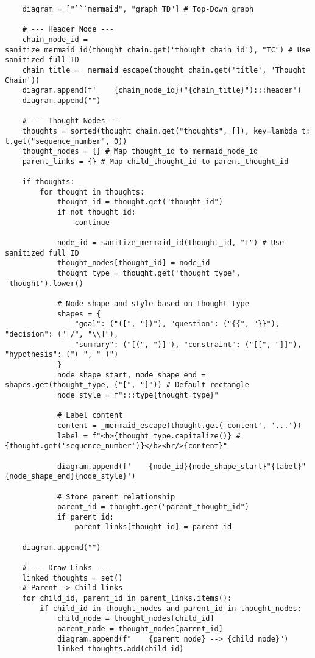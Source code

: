 \documentclass[12pt,a4paper]{article}
\begin{document}
\begin{pageablecode}
\begin{verbatim}
    diagram = ["```mermaid", "graph TD"] # Top-Down graph

    # --- Header Node ---
    chain_node_id = sanitize_mermaid_id(thought_chain.get('thought_chain_id'), "TC") # Use sanitized full ID
    chain_title = _mermaid_escape(thought_chain.get('title', 'Thought Chain'))
    diagram.append(f'    {chain_node_id}("{chain_title}"):::header')
    diagram.append("")

    # --- Thought Nodes ---
    thoughts = sorted(thought_chain.get("thoughts", []), key=lambda t: t.get("sequence_number", 0))
    thought_nodes = {} # Map thought_id to mermaid_node_id
    parent_links = {} # Map child_thought_id to parent_thought_id

    if thoughts:
        for thought in thoughts:
            thought_id = thought.get("thought_id")
            if not thought_id: 
                continue

            node_id = sanitize_mermaid_id(thought_id, "T") # Use sanitized full ID
            thought_nodes[thought_id] = node_id
            thought_type = thought.get('thought_type', 'thought').lower()

            # Node shape and style based on thought type
            shapes = {
                "goal": ("([", "])"), "question": ("{{", "}}"), "decision": ("[/", "\\]"),
                "summary": ("[(", ")]"), "constraint": ("[[", "]]"), "hypothesis": ("( ", " )")
            }
            node_shape_start, node_shape_end = shapes.get(thought_type, ("[", "]")) # Default rectangle
            node_style = f":::type{thought_type}"

            # Label content
            content = _mermaid_escape(thought.get('content', '...'))
            label = f"<b>{thought_type.capitalize()} #{thought.get('sequence_number')}</b><br/>{content}"

            diagram.append(f'    {node_id}{node_shape_start}"{label}"{node_shape_end}{node_style}')

            # Store parent relationship
            parent_id = thought.get("parent_thought_id")
            if parent_id:
                parent_links[thought_id] = parent_id

    diagram.append("")

    # --- Draw Links ---
    linked_thoughts = set()
    # Parent -> Child links
    for child_id, parent_id in parent_links.items():
        if child_id in thought_nodes and parent_id in thought_nodes:
            child_node = thought_nodes[child_id]
            parent_node = thought_nodes[parent_id]
            diagram.append(f"    {parent_node} --> {child_node}")
            linked_thoughts.add(child_id)


\end{verbatim}
\end{pageablecode}
\end{document}
